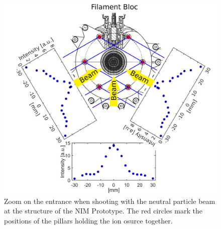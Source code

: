 	\begin{figure}[h!]
		\centering
		\includegraphics[width=\textwidth]{Experiments/Entrence_Proto_topview.png}
		\caption{Zoom on the entrance when shooting with the neutral particle beam at the structure of the NIM Prototype. The red circles mark the positions of the pillars holding the ion osurce together.}
		\label{exp:ProtoIntCharEnt}
	\end{figure}
	
	
